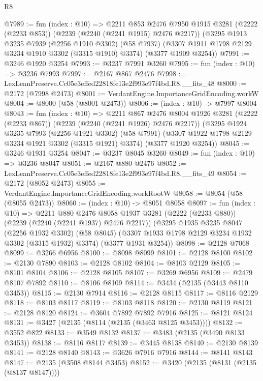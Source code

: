 \begin{lexlean}{R8}
\begin{coremodule}
@7989 := fun (index : @10) =>
  @2211
    @853
    @2476
    @7950
    @1915
    @3281
    (@2222 (@2233 @853))
    (@2239 (@2240 (@2241 @1915) @2476 @2217))
    (@3295
      @1913
      @3235
      @7939
      (@2256 @1910 @3302)
      (@58 @7937)
      (@3307 @1911 @1798 @2129 @3234 @1910 @3302 (@3315 @1910) @3374)
      (@3377 @1909 @3254))
@7991 := @3246 @1920 @3254
@7993 := @3237 @7991 @3260
@7995 := fun (index : @10) => @3236 @7993
@7997 := @2167 @867 @2476
@7998 := LexLeanPreserve.Cc05e3effed22818fe13e2f993e97f4bd.R8.__fits_48
@8000 := @2172 (@7998 @2473)
@8001 := VerdantEngine.ImportanceGridEncoding.workW
@8004 := @8000 (@58 (@8001 @2473))
@8006 := (index : @10) -> @7997 @8004
@8043 := fun (index : @10) =>
  @2211
    @867
    @2476
    @8004
    @1926
    @3281
    (@2222 (@2233 @867))
    (@2239 (@2240 (@2241 @1926) @2476 @2217))
    (@3295
      @1924
      @3235
      @7993
      (@2256 @1921 @3302)
      (@58 @7991)
      (@3307 @1922 @1798 @2129 @3234 @1921 @3302 (@3315 @1921) @3374)
      (@3377 @1920 @3254))
@8045 := @3246 @1931 @3254
@8047 := @3237 @8045 @3260
@8049 := fun (index : @10) => @3236 @8047
@8051 := @2167 @880 @2476
@8052 := LexLeanPreserve.Cc05e3effed22818fe13e2f993e97f4bd.R8.__fits_49
@8054 := @2172 (@8052 @2473)
@8055 := VerdantEngine.ImportanceGridEncoding.workRootW
@8058 := @8054 (@58 (@8055 @2473))
@8060 := (index : @10) -> @8051 @8058
@8097 := fun (index : @10) =>
  @2211
    @880
    @2476
    @8058
    @1937
    @3281
    (@2222 (@2233 @880))
    (@2239 (@2240 (@2241 @1937) @2476 @2217))
    (@3295
      @1935
      @3235
      @8047
      (@2256 @1932 @3302)
      (@58 @8045)
      (@3307 @1933 @1798 @2129 @3234 @1932 @3302 (@3315 @1932) @3374)
      (@3377 @1931 @3254))
@8098 := @2128 @7068
@8099 := @3266 @6956
@8100 := @8098 @8099
@8101 := @2128 @8100
@8102 := @2130 @7890
@8103 := @2128 @8102
@8104 := @8103 @2129
@8105 := @8101 @8104
@8106 := @2128 @8105
@8107 := @3269 @6956
@8109 := @2479 @8107 @7892
@8110 := @8106 @8109
@8114 := @3434 (@2135 (@3443 @8110 @3453))
@8115 := @2130 @7914
@8116 := @2128 @8115
@8117 := @8116 @2129
@8118 := @8103 @8117
@8119 := @8103 @8118
@8120 := @2130 @8119
@8121 := @2128 @8120
@8124 := @3604 @7892 @7892 @7916
@8125 := @8121 @8124
@8131 := @3427 (@2135 (@8114 (@2135 (@3463 @8125 @3453))))
@8132 := @3552 @822
@8133 := @3549 @8132
@8137 := @3483 (@2135 (@3490 @8133 @3453))
@8138 := @8116 @8117
@8139 := @3445 @8138
@8140 := @2130 @8139
@8141 := @2128 @8140
@8143 := @3626 @7916 @7916
@8144 := @8141 @8143
@8147 := @2135 (@3508 @8144 @3453)
@8152 := @3420 (@2135 (@8131 (@2135 (@8137 @8147))))

\end{coremodule}
\end{lexlean}
